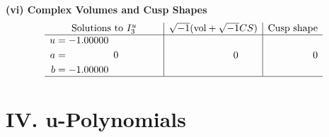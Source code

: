 \documentclass[1p]{elsarticle_modified}
\theoremstyle{definition}
\newcommand{\I}{\sqrt{-1}}
\begin{document}
\newpage\flushleft \textbf{(vi) Complex Volumes and Cusp Shapes}
$$\begin{array}{c|c|c}  
\text{Solutions to }I^u_{3}& \I (\text{vol} + \sqrt{-1}CS) & \text{Cusp shape}\\
 \hline 
\begin{aligned}
u &= -1.00000\phantom{ +0.000000I} \\
a &= \phantom{-0.000000 } 0 \\
b &= -1.00000\phantom{ +0.000000I}\end{aligned}
 & \phantom{-0.000000 } 0 & \phantom{-0.000000 } 0\\
 \hline 
 \end{array}$$\newpage
\newpage\renewcommand{\arraystretch}{1}
\centering \section*{ IV. u-Polynomials}
\end{document}
